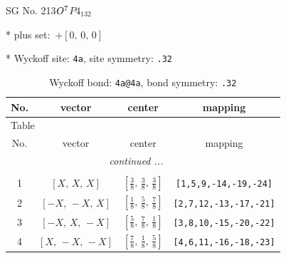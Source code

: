 \documentclass[fleqn,8pt]{jsarticle}
\begin{document}
\setcounter{MaxMatrixCols}{32}

\renewcommand{\tablename}{Table~}
\renewcommand{\figurename}{Figure~}
\begin{center}
\LARGE
SG No. 213\quad$O_{\rm }^{7}$\quad$P4_132$\quad[ cubic ]
\end{center}

* plus set:\,\,\,$+\left[ 0,\, 0,\, 0 \right]$


* Wyckoff site: {\tt 4a}, site symmetry: {\tt .32}
\renewcommand{\arraystretch}{1.2}
\begin{longtable}{cccc}
\caption{Wyckoff bond: {\tt 4a@4a}, bond symmetry: {\tt .32}}
 \\
 \hline \hline
No. & vector & center & mapping \\ \hline \endfirsthead

\multicolumn{3}{l}{\tablename\ \thetable{}} \\
 \hline \hline
No. & vector & center & mapping \\ \hline \endhead

 \hline \hline
\multicolumn{3}{r}{\footnotesize\it continued ...} \\ \endfoot

 \hline \hline
\multicolumn{3}{r}{} \\ \endlastfoot

1 & $\left[ X,\, X,\, X \right]$ & $\left[ \frac{3}{8},\, \frac{3}{8},\, \frac{3}{8} \right]$ & {\tt [1,5,9,-14,-19,-24]} \\ \hline
2 & $\left[ - X,\, - X,\, X \right]$ & $\left[ \frac{1}{8},\, \frac{5}{8},\, \frac{7}{8} \right]$ & {\tt [2,7,12,-13,-17,-21]} \\ \hline
3 & $\left[ - X,\, X,\, - X \right]$ & $\left[ \frac{5}{8},\, \frac{7}{8},\, \frac{1}{8} \right]$ & {\tt [3,8,10,-15,-20,-22]} \\ \hline
4 & $\left[ X,\, - X,\, - X \right]$ & $\left[ \frac{7}{8},\, \frac{1}{8},\, \frac{5}{8} \right]$ & {\tt [4,6,11,-16,-18,-23]} \\
\end{longtable}
\renewcommand{\arraystretch}{1.2}
\end{document}
